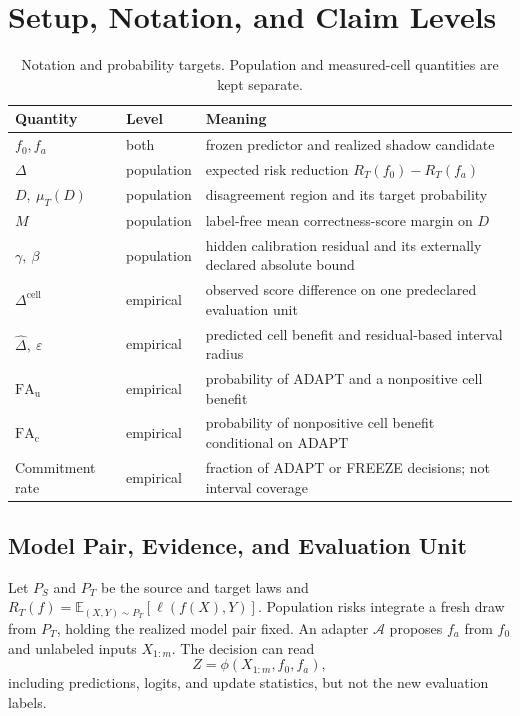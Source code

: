 \section{Setup, Notation, and Claim Levels}
\label{sec:compact-setup}

\begin{table}[t]
\centering
\footnotesize
\caption{Notation and probability targets. Population and measured-cell quantities are kept separate.}
\label{tab:compact-bridge}
\begin{tabular}{@{}p{}p{}p{}@{}}
\toprule
Quantity & Level & Meaning \\
\midrule
$f_0,f_a$ & both & frozen predictor and realized shadow candidate \\
$\Delta$ & population & expected risk reduction $R_T(f_0)-R_T(f_a)$ \\
$D,\ \mu_T(D)$ & population & disagreement region and its target probability \\
$M$ & population & label-free mean correctness-score margin on $D$ \\
$\gamma,\ \beta$ & population & hidden calibration residual and its externally declared absolute bound \\
$\Delta^{\mathrm{cell}}$ & empirical & observed score difference on one predeclared evaluation unit \\
$\widehat\Delta,\ \varepsilon$ & empirical & predicted cell benefit and residual-based interval radius \\
$\mathrm{FA}_{\mathrm u}$ & empirical & probability of ADAPT and a nonpositive cell benefit \\
$\mathrm{FA}_{\mathrm c}$ & empirical & probability of nonpositive cell benefit conditional on ADAPT \\
Commitment rate & empirical & fraction of ADAPT or FREEZE decisions; not interval coverage \\
\bottomrule
\end{tabular}
\end{table}

\subsection{Model Pair, Evidence, and Evaluation Unit}

Let $P_S$ and $P_T$ be the source and target laws and
$R_T(f)=\mathbb E_{(X,Y)\sim P_T}[\ell(f(X),Y)]$.
Population risks integrate a fresh draw from $P_T$, holding the realized model pair fixed.
An adapter $\mathcal A$ proposes $f_a$ from $f_0$ and unlabeled inputs $X_{1:m}$.
The decision can read
\[
  Z=\phi(X_{1:m},f_0,f_a),
\]
including predictions, logits, and update statistics, but not the new evaluation labels.

